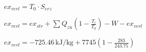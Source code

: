 \( ex_{verl} = T_0 \cdot S_{erz} \)  

\( ex_{verl} = ex_{str} + \sum Q_{zu} \left( 1 - \frac{T_i}{T_0} \right) - W - ex_{verl} \)  

\( ex_{verl} = -725.46 \, \text{kJ/kg} + 7745 \left( 1 - \frac{283}{243.75} \right) \)